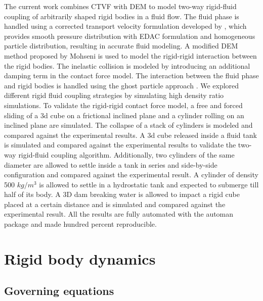 \documentclass[preprint,12pt]{elsarticle}
\begin{document}
The current work combines CTVF with DEM to model two-way rigid-fluid coupling
of arbitrarily shaped rigid bodies in a fluid flow. The fluid phase is handled
using a corrected transport velocity formulation developed by \cite{adepu2021corrected},
which provides smooth pressure distribution with EDAC formulation and
homogeneous particle distribution, resulting in accurate fluid modeling. A
modified DEM method proposed by Mohseni is used to model the rigid-rigid
interaction between the rigid bodies. The inelastic collision is modeled by
introducing an additional damping term in the contact force model. The
interaction between the fluid phase and rigid bodies is handled using the
ghost particle approach \cite{Adami2012}. We explored different rigid fluid
coupling strategies by simulating high density ratio simulations. To validate
the rigid-rigid contact force model, a free and forced sliding of a 3d cube on
a frictional inclined plane and a cylinder rolling on an inclined plane are
simulated. The collapse of a stack of cylinders is modeled and compared
against the experimental results. A 3d cube released inside a fluid tank is
simulated and compared against the experimental results to validate the
two-way rigid-fluid coupling algorithm. Additionally, two cylinders of the
same diameter are allowed to settle inside a tank in series and side-by-side
configuration and compared against the experimental result. A cylinder of
density 500 $kg/m^3$ is allowed to settle in a hydrostatic tank and expected
to submerge till half of its body. A 3D dam breaking water is allowed to
impact a rigid cube placed at a certain distance and is simulated and compared
against the experimental result. All the results are fully automated with the
automan package \cite{automan2018} and made hundred percent reproducible.


\FloatBarrier%
\section{Rigid body dynamics}
\label{sec:rbd}


\subsection{Governing equations}
\end{document}
